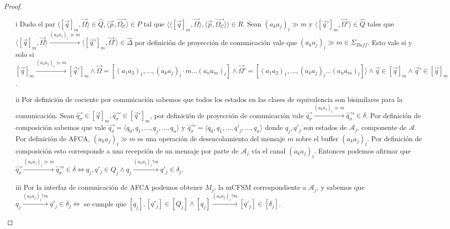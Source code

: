 \begin{proof}
\begin{itemize}
    \item[i] Dado el par $\langle [\overrightarrow{q}]_m, \overrightarrow{\Omega} \rangle \in \hat{Q}, \langle \overrightarrow{p}, \overrightarrow{\Omega_\mathcal{C}} \rangle \in P$ tal que $\langle \langle [\overrightarrow{q}]_m, \overrightarrow{\Omega} \rangle, \langle \overrightarrow{p}, \overrightarrow{\Omega_\mathcal{C}} \rangle \rangle \in R$. Sean $(a_ka_j)_l \gg m$ y $\langle [\overrightarrow{q}']_m, \overrightarrow{\Omega}' \rangle \in \hat{Q}$ tales que $\langle [\overrightarrow{q}]_m, \overrightarrow{\Omega} \rangle \xrightarrow{(a_ka_j)_l \gg m} \langle [\overrightarrow{q}']_m, \overrightarrow{\Omega}' \rangle \in \hat{\Delta}$ por definición de proyección de comunicación vale que $(a_ka_j)_l \gg m \in \Sigma_{Buff}$.  Esto vale si y solo si $[\overrightarrow{q}]_m \xrightarrow{(a_ka_j)_l \gg m} [\overrightarrow{q}']_m \land \overrightarrow{\Omega} = [(a_1a_2)_1, \ldots, (a_ka_j)_l \cdot m \ldots (a_na_m)_l] \land \overrightarrow{\Omega}' = [(a_1a_2)_1, \ldots, (a_ka_j)_l \ldots (a_na_m)_l] \rangle \land \overrightarrow{q} \in [\overrightarrow{q}]_m \land \overrightarrow{q}' \in [\overrightarrow{q}]_m$.
    
    \item[ii] Por definición de cociente por comunicación sabemos que todos los estados en las clases de equivalencia son bisimilares para la comunicación. Sean $\overrightarrow{q_{\sigma}} \in [\overrightarrow{q}]_m, \overrightarrow{q_{\sigma}}' \in [\overrightarrow{q}']_m$, por definición de proyección de comunicación vale $\overrightarrow{q_{\sigma}} \xrightarrow{(a_ka_j)_l \gg m} \overrightarrow{q_{\sigma}}' \in \delta$. Por definición de composición sabemos que vale $\overrightarrow{q_{\sigma}} =\langle q_0, q_1, \ldots, q_j, \ldots,q_n \rangle$ y $\overrightarrow{q_{\sigma}}' =\langle q_0, q_1, \ldots, q'_j, \ldots,q_n \rangle$ donde $q_j,q'_j$ son estados de $\mathcal{A}_j$, componente de $\mathcal{A}$. Por definición de AFCA, $(a_ka_j)_l \gg m$ es una operación de desencolamiento del mensaje $m$ sobre el buffer $(a_ka_j)_l$. Por definición de composición esto corresponde a una recepción de un mensaje por parte de $\mathcal{A}_j$ vía el canal $(a_ka_j)_l$. Entonces podemos afirmar que $\overrightarrow{q_{\sigma}} \xrightarrow{(a_ka_j)_l \gg m} \overrightarrow{q_{\sigma}}'\in \delta \iff q_j,q'_j \in Q_j \land q_j \xrightarrow{(a_ka_j)_l?m} q'_j \in \delta_j$.
    
    \item[iii] Por la interfaz de comunicación de AFCA podemos obtener $M_j$, la mCFSM correspondiente a $\mathcal{A}_j$, y sabemos que $q_j \xrightarrow{(a_ka_j)_l?m} q'_j \in \delta_j \iff$ se cumple que $[q_j], [q'_j] \in [Q_j] \land [q_j] \xrightarrow{(a_ka_j)_l?m} [q'_j] \in [\delta_j]$. 
    

\end{itemize}
\end{proof}
